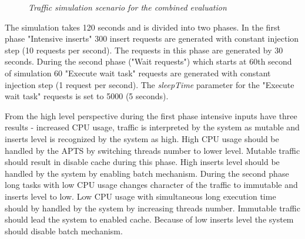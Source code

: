 \documentclass[12pt,a4paper]{article}
\begin{document}
\begin{figure}[!htb]
\begin{center}
\caption{\textit{Traffic simulation scenario for the combined evaluation}} \label{figure:trafficcombined}
\end{center}
\end{figure}

The simulation takes 120 seconds and is divided into two phases. In the first phase "Intensive inserts" 300 insert requests are generated with constant injection step (10 requests per second). The requests in this phase are generated by 30 seconds. During the second phase ("Wait requests") which starts at 60th second of simulation 60 "Execute wait task" requests are generated with constant injection step (1 request per second). The \textit{sleepTime} parameter for the "Execute wait task" requests is set to 5000 (5 seconds).

From the high level perspective during the first phase intensive inputs have three results - increased CPU usage, traffic is interpreted by the system as mutable and inserts level is recognized by the system as high.  High CPU usage should be handled by the APTS by switching threads number to lower level. Mutable traffic should result in disable cache during this phase. High inserts level should be handled by the system by enabling batch mechanism. During the second phase long tasks with low CPU usage changes character of the traffic to immutable and inserts level to low. Low CPU usage with simultaneous long execution time should by handled by the system by increasing threads number. Immutable traffic should lead the system to enabled cache. Because of low inserts level the system should disable batch mechanism. 
\end{document}
